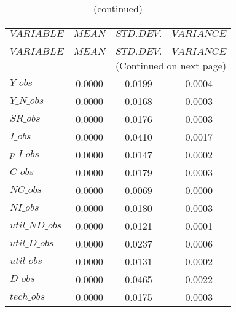  
\begin{center}
\begin{longtable}{lccc} 
\caption{THEORETICAL MOMENTS}\\
 \label{Table:th_moments}\\
\toprule 
$VARIABLE       $	 & 	 $         MEAN$	 & 	 $    STD. DEV.$	 & 	 $     VARIANCE$\\
\midrule \endfirsthead 
\caption{(continued)}\\
 \toprule \\ 
$VARIABLE       $	 & 	 $         MEAN$	 & 	 $    STD. DEV.$	 & 	 $     VARIANCE$\\
\midrule \endhead 
\midrule \multicolumn{4}{r}{(Continued on next page)} \\ \bottomrule \endfoot 
\bottomrule \endlastfoot 
$Y\_obs         $	 & 	       0.0000	 & 	       0.0199	 & 	       0.0004 \\ 
$Y\_N\_obs      $	 & 	       0.0000	 & 	       0.0168	 & 	       0.0003 \\ 
$SR\_obs        $	 & 	       0.0000	 & 	       0.0176	 & 	       0.0003 \\ 
$I\_obs         $	 & 	       0.0000	 & 	       0.0410	 & 	       0.0017 \\ 
$p\_I\_obs      $	 & 	       0.0000	 & 	       0.0147	 & 	       0.0002 \\ 
$C\_obs         $	 & 	       0.0000	 & 	       0.0179	 & 	       0.0003 \\ 
$NC\_obs        $	 & 	       0.0000	 & 	       0.0069	 & 	       0.0000 \\ 
$NI\_obs        $	 & 	       0.0000	 & 	       0.0180	 & 	       0.0003 \\ 
$util\_ND\_obs  $	 & 	       0.0000	 & 	       0.0121	 & 	       0.0001 \\ 
$util\_D\_obs   $	 & 	       0.0000	 & 	       0.0237	 & 	       0.0006 \\ 
$util\_obs      $	 & 	       0.0000	 & 	       0.0131	 & 	       0.0002 \\ 
$D\_obs         $	 & 	       0.0000	 & 	       0.0465	 & 	       0.0022 \\ 
$tech\_obs      $	 & 	       0.0000	 & 	       0.0175	 & 	       0.0003 \\ 
\end{longtable}
 \end{center}
